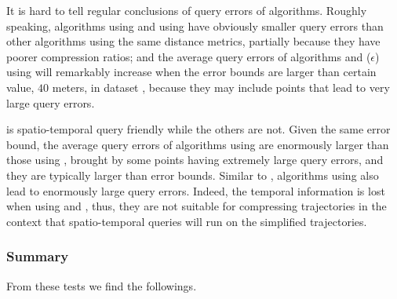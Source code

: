 It is hard to tell regular conclusions of query errors of \lsa algorithms. Roughly speaking, algorithms \intersec using \dad and \squishe using \sed have obviously smaller query errors than other algorithms using the same distance metrics, partially because they have poorer compression ratios; and the average query errors of algorithms \operb and \siped($\epsilon$) using \ped will remarkably increase when the error bounds are larger than certain value, \eg $40$ meters, in dataset \mopsi, because they may include points that lead to very large query errors.





\sed is spatio-temporal query friendly while the others are not.
Given the same error bound, the average query errors of algorithms using \ped are enormously larger than those using \sed, brought by some points having extremely large query errors, and they are typically larger than error bounds.
Similar to \ped, algorithms using \dad also lead to enormously large query errors.
Indeed, the temporal information is lost when using \ped and \dad, thus, they are not suitable for compressing trajectories in the context that spatio-temporal queries will run on the simplified trajectories.




\subsubsection{Summary}
From these tests we find the followings.

